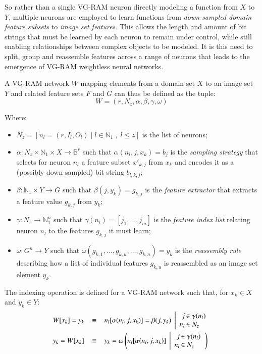 \documentclass[twocolumn, 9pt]{jsproceedings}
\begin{document}
So rather than a single VG-RAM neuron directly modeling a function from \(X\) to \(Y\), multiple neurons are employed to learn functions from {\it down-sampled domain feature subsets} to {\it image set features}. This allows the length and amount of bit strings that must be learned by each neuron to remain under control, while still enabling relationships between complex objects to be modeled. It is this need to split, group and reassemble features across a range of neurons that leads to the emergence of VG-RAM weightless neural networks.

A VG-RAM network \(W\) mapping elements from a domain set \(X\) to an image set \(Y\) and related feature sets \(F\) and \(G\) can thus be defined as the tuple:
\begin{equation}
W = (r, N_z, \alpha, \beta, \gamma, \omega)
\end{equation}

Where:

\begin{itemize}
\item \(N_z = [n_l = (r, I_l, O_l) \; | \; l \in \mathbb{N}_1 \; , \; l \leq z]\) is the list of neurons;
\item \(\alpha : N_z \times \mathbb{N}_1 \times X \to \mathbb{B}^r\) such that \(\alpha(n_l, j, x_k) = b_j\) is the {\it sampling strategy} that selects for neuron \(n_l\) a feature subset \(x'_{k,j}\) from \(x_k\) and encodes it as a (possibly down-sampled) bit string \(b_{l,k,j}\);
\item \(\beta : \mathbb{N}_1 \times Y \to G\) such that \(\beta(j, y_k) = g_{k,j}\) is the {\it feature extractor} that extracts a feature value \(g_{k,j}\) from \(y_k\);
\item \(\gamma : N_z \to \mathbb{N}^{n}_1\) such that \(\gamma(n_l) = [j_1, \dotsc, j_m]\) is the {\it feature index list} relating neuron \(n_l\) to the features \(g_{k,j}\) it must learn;
\item \(\omega : G^n \to Y\) such that \(\omega(g_{k,1} , \dotsc , g_{k,u} , \dotsc , g_{k,n}) = y_k\) is the {\it reassembly rule} describing how a list of individual features \(g_{k,u}\) is reassembled as an image set element \(y_k\).
\end{itemize}

The indexing operation is defined for a VG-RAM network such that, for \(x_k \in X\) and  \(y_k \in Y\):
{ \setlength{\mathindent}{4pt}
\begin{align}
W [ x_k ] = y_k \;\;\; & \equiv \;\;\; n_l[\alpha(n_l, j, x_k)] = \beta(j, y_k) \; \left|
\begin{array}{r@{\hspace{2bp}} l}
j & \in \gamma(n_l) \\
n_l & \in N_z
\end{array}
\right. \\
y_k = W [ x_k ] \;\;\; & \equiv \;\;\; y_k = \omega\left(n_l[\alpha(n_l, j, x_k)] \; \left|
\begin{array}{r@{\hspace{2bp}} l}
j & \in \gamma(n_l) \\
n_l & \in N_z
\end{array}
\right.
\right)
\end{align}
}
\end{document}
